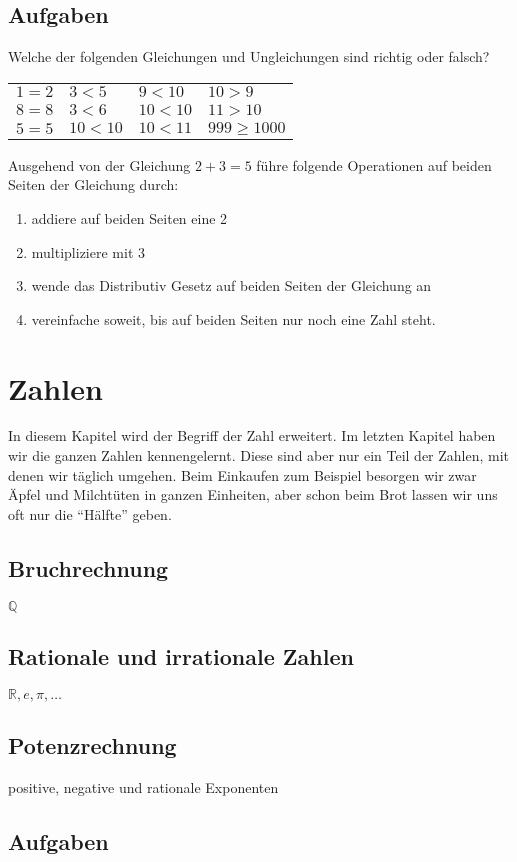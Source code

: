 \section{Aufgaben}
\begin{prob}
\label{arith.1.1}

Welche der folgenden Gleichungen und Ungleichungen sind richtig oder falsch?
\begin{center}
\begin{tabular}{C{2cm}C{2cm}C{2cm}C{2cm}}
$1=2$ & $3<5$ & $9<10$ & $10>9$ \\
$8=8$ & $3<6$ & $10<10$ & $11>10$ \\
$5=5$ & $10<10$ & $10<11$ & $999 \ge 1000$ 
\end{tabular}
\end{center}
\end{prob}

\begin{prob}
\label{arith.1.2}
Ausgehend von der Gleichung $2+3=5$ führe folgende Operationen auf beiden Seiten der Gleichung durch:
\begin{enumerate}
\item addiere auf beiden Seiten eine 2
\item multipliziere mit 3
\item wende das Distributiv Gesetz auf beiden Seiten der Gleichung an
\item vereinfache soweit, bis auf beiden Seiten nur noch eine Zahl steht.
\end{enumerate}
\end{prob}



\chapter{Zahlen}

In diesem Kapitel wird der Begriff der Zahl erweitert. Im letzten Kapitel haben wir die ganzen Zahlen kennengelernt. Diese sind aber nur ein Teil der Zahlen, mit denen wir täglich umgehen. Beim Einkaufen zum Beispiel besorgen wir zwar Äpfel und Milchtüten in ganzen Einheiten, aber schon beim Brot lassen wir uns oft nur die "`Hälfte"' geben. 

\section{Bruchrechnung}

$\mathbb{Q}$

\section{Rationale und irrationale Zahlen}

$\mathbb{R}, e, \pi, \dots $

\section{Potenzrechnung}

positive, negative und rationale Exponenten


\section{Aufgaben}

